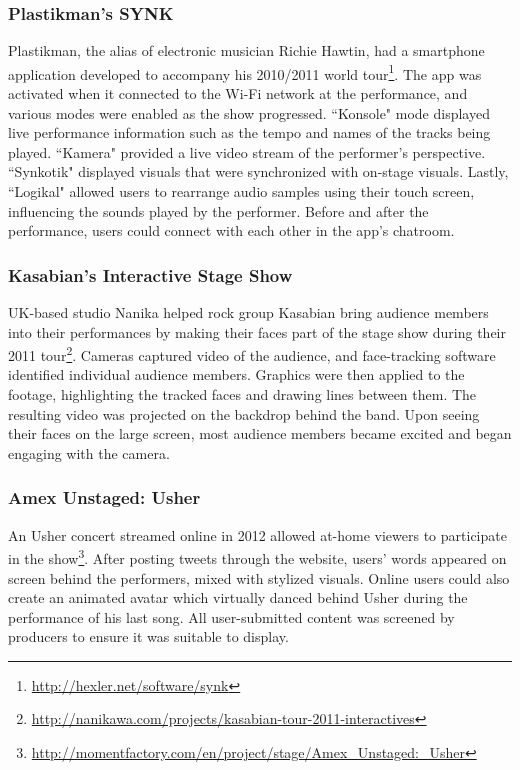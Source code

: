 \subsubsection{Plastikman's SYNK}

Plastikman, the alias of electronic musician Richie Hawtin, had a smartphone application developed to accompany his 2010/2011 world tour\footnote{\url{http://hexler.net/software/synk}}. The app was activated when it connected to the Wi-Fi network at the performance, and various modes were enabled as the show progressed. ``Konsole" mode displayed live performance information such as the tempo and names of the tracks being played. ``Kamera" provided a live video stream of the performer's perspective. ``Synkotik" displayed visuals that were synchronized with on-stage visuals. Lastly, ``Logikal" allowed users to rearrange audio samples using their touch screen, influencing the sounds played by the performer. Before and after the performance, users could connect with each other in the app's chatroom.

\subsubsection{Kasabian's Interactive Stage Show}

UK-based studio Nanika helped rock group Kasabian bring audience members into their performances by making their faces part of the stage show during their 2011 tour\footnote{\url{http://nanikawa.com/projects/kasabian-tour-2011-interactives}}. Cameras captured video of the audience, and face-tracking software identified individual audience members. Graphics were then applied to the footage, highlighting the tracked faces and drawing lines between them. The resulting video was projected on the backdrop behind the band. Upon seeing their faces on the large screen, most audience members became excited and began engaging with the camera.

\subsubsection{Amex Unstaged: Usher}
An Usher concert streamed online in 2012 allowed at-home viewers to participate in the show\footnote{\url{http://momentfactory.com/en/project/stage/Amex_Unstaged:_Usher}}. After posting tweets through the website, users' words appeared on screen behind the performers, mixed with stylized visuals. Online users could also create an animated avatar which virtually danced behind Usher during the performance of his last song. All user-submitted content was screened by producers to ensure it was suitable to display. 

